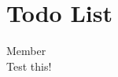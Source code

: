 \chapter{Todo List}
\hypertarget{todo}{}\label{todo}

\begin{DoxyRefList}
\item[Member \doxylink{class_dead_fuel_moisture_a678ecb2fa5d10d2c86bf616b2c9e6a1a}{operator\texorpdfstring{$>$}{>}\texorpdfstring{$>$}{>}} ]\hfill \\
\label{todo__todo000001}%
%
Test this!
\end{DoxyRefList}